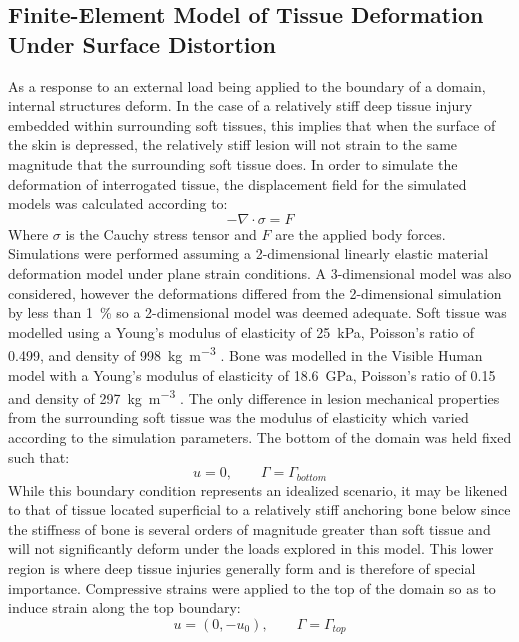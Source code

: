 		\subsection{Finite-Element Model of Tissue Deformation Under Surface Distortion}
			As a response to an external load being applied to the boundary of a domain, internal structures deform. In the case of a relatively stiff deep tissue injury embedded within surrounding soft tissues, this implies that when the surface of the skin is depressed, the relatively stiff lesion will not strain to the same magnitude that the surrounding soft tissue does. In order to simulate the deformation of interrogated tissue, the displacement field for the simulated models was calculated according to:
			\begin{equation}
				- {\nabla} \cdot \sigma = {F}
			\end{equation}
			Where $\sigma$ is the Cauchy stress tensor and $F$ are the applied body forces. Simulations were performed assuming a 2-dimensional linearly elastic material deformation model under plane strain conditions. A 3-dimensional model was also considered, however the deformations differed from the 2-dimensional simulation by less than \SI{1}{\percent} so a 2-dimensional model was deemed adequate. Soft tissue was modelled using a Young's modulus of elasticity of \SI{25}{\kPa}, Poisson's ratio of 0.499, and density of \SI{998}{\kg\per\metre\cubed} \cite{krouskop98, choi05, martin94}. Bone was modelled in the Visible Human model with a Young's modulus of elasticity of \SI{18.6}{\GPa}, Poisson's ratio of 0.15 and density of \SI{297}{\kg\per\metre\cubed} \cite{rho93,shahar07,zheng00}. The only difference in lesion mechanical properties from the surrounding soft tissue was the modulus of elasticity which varied according to the simulation parameters. The bottom of the domain was held fixed such that:
			\begin{equation}
				{u} = 0, \qquad \Gamma = \Gamma_{bottom}
			\end{equation}
			While this boundary condition represents an idealized scenario, it may be likened to that of tissue located superficial to a relatively stiff anchoring bone below since the stiffness of bone is several orders of magnitude greater than soft tissue and will not significantly deform under the loads explored in this model. This lower region is where deep tissue injuries generally form and is therefore of special importance. Compressive strains were applied to the top of the domain so as to induce strain along the top boundary:
			\begin{equation}
				{u} = (0, -u_0), \qquad \Gamma = \Gamma_{top}
			\end{equation}

